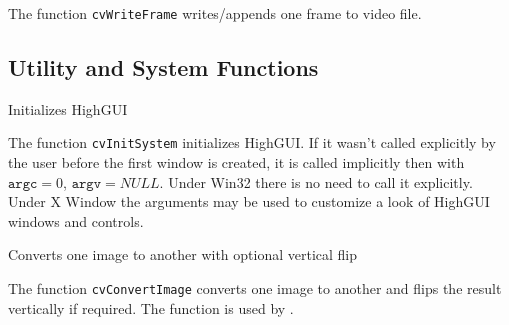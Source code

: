 The function \texttt{cvWriteFrame} writes/appends one frame to video file.

\subsection{Utility and System Functions}


Initializes HighGUI


\begin{description}
\end{description}

The function \texttt{cvInitSystem} initializes HighGUI. If it wasn't
called explicitly by the user before the first window is created, it is
called implicitly then with $\texttt{argc}=0$, $\texttt{argv}=NULL$. Under
Win32 there is no need to call it explicitly. Under X Window the arguments
may be used to customize a look of HighGUI windows and controls.


Converts one image to another with optional vertical flip


\begin{description}
\end{description}

The function \texttt{cvConvertImage} converts one image to another and flips the result vertically if required. The function is used by .
